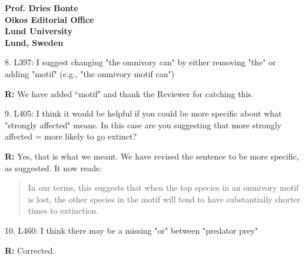 \documentclass[12pt]{letter}
\begin{document}
\begin{letter}{\bf Prof. Dries Bonte\\
Oikos Editorial Office \\
Lund University \\
Lund, Sweden}
    \smallskip

    8. L397: I suggest changing "the omnivory can" by either removing "the" or adding "motif" (e.g., "the omnivory motif can")

    \smallskip

    \textbf{R:} We have added ``motif" and thank the Reviewer for catching this.

    \smallskip

    9. L405: I think it would be helpful if you could be more specific about what "strongly affected" means. In this case are you suggesting that more strongly affected = more likely to go extinct?


    \smallskip

    \textbf{R:} Yes, that is what we meant. We have revised the sentence to be more specific, as suggested. It now reads:
  
      \begin{quotation}
      In our terms, this suggests that when the top species in an omnivory motif is lost, the other species in the motif will tend to have substantially shorter times to extinction.
      \end{quotation}

    \smallskip

    10. L460: I think there may be a missing "or" between "predator prey"

    \smallskip

    \textbf{R:} Corrected.

    \smallskip

\clearpage

\end{letter}

\clearpage
    
 
\end{document}
